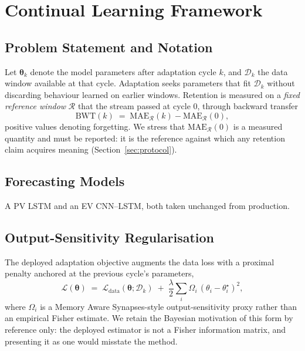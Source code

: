 \documentclass[journal]{IEEEtran}
\newcommand{\params}{\boldsymbol{\theta}}
\newcommand{\ewclambda}{\lambda}
\begin{document}
\section{Continual Learning Framework}
\label{sec:cl}

\subsection{Problem Statement and Notation}
Let $\params_k$ denote the model parameters after adaptation cycle $k$, and
$\mathcal{D}_k$ the data window available at that cycle. Adaptation seeks
parameters that fit $\mathcal{D}_k$ without discarding behaviour learned on
earlier windows. Retention is measured on a \emph{fixed reference window}
$\mathcal{R}$ that the stream passed at cycle $0$, through backward transfer
\begin{equation}
\mathrm{BWT}(k) \;=\; \mathrm{MAE}_{\mathcal{R}}(k) - \mathrm{MAE}_{\mathcal{R}}(0),
\label{eq:bwt}
\end{equation}
positive values denoting forgetting. We stress that
$\mathrm{MAE}_{\mathcal{R}}(0)$ is a measured quantity and must be reported: it
is the reference against which any retention claim acquires meaning
(Section~\ref{sec:protocol}).

\subsection{Forecasting Models}
A PV LSTM and an EV CNN--LSTM, both taken unchanged from production.

\subsection{Output-Sensitivity Regularisation}
\label{sec:osr}
The deployed adaptation objective augments the data loss with a proximal
penalty anchored at the previous cycle's parameters,
\begin{equation}
\mathcal{L}(\params) \;=\; \mathcal{L}_{\mathrm{data}}(\params;\mathcal{D}_k)
\;+\; \frac{\ewclambda}{2}\sum_i \Omega_i\,(\theta_i - \theta^{\star}_i)^2 ,
\label{eq:osr}
\end{equation}
where $\Omega_i$ is a Memory Aware Synapses-style output-sensitivity proxy
rather than an empirical Fisher estimate. We retain the Bayesian motivation of
this form by reference only: the deployed estimator is not a Fisher information
matrix, and presenting it as one would misstate the method.
\end{document}
